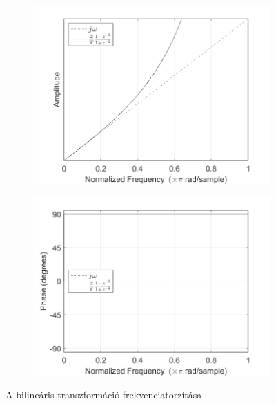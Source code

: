 \begin{figure}[!h]
    \centering
    \begin{subfigure}{0.47\textwidth}
        \centering
        \includegraphics[scale=0.38]{figures/bilinearA.png}
        \caption{}
    \end{subfigure}
    \hfill
    \begin{subfigure}{0.47\textwidth}
        \centering
        \includegraphics[scale=0.38]{figures/bilinearP.png}
        \caption{}
    \end{subfigure}
    \caption{A bilineáris transzformáció frekvenciatorzítása}
\end{figure}

